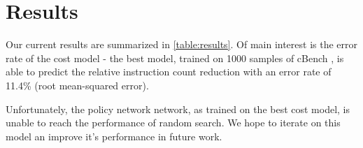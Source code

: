 \documentclass[conference]{IEEEtran}
\begin{document}
\section{Results}

Our current results are summarized in \ref{table:results}. Of main interest is
the error rate of the cost model - the best model, trained on 1000 samples of
cBench \cite{fursin2009collective}, is able to predict the relative instruction
count reduction with an error rate of 11.4\% (root mean-squared error).


Unfortunately, the policy network network, as trained on the best cost model, is
unable to reach the performance of random search. We hope to iterate on this
model an improve it's performance in future work.
\end{document}
